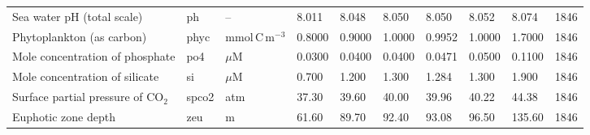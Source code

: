\documentclass[a4paper,fleqn]{cas-sc}
\begin{document}
\begin{table}[width=\linewidth,cols=10,pos=!htbp]
\begin{tabular*}{\tblwidth}{@{} LLLLLLLLL R @{}}
Sea water pH (total scale) & ph & -- & 8.011 & 8.048 & 8.050 & 8.050 & 8.052 & 8.074 & 1846 \\
Phytoplankton (as carbon) & phyc & mmol\,C\,m$^{-3}$ & 0.8000 & 0.9000 & 1.0000 & 0.9952 & 1.0000 & 1.7000 & 1846 \\
Mole concentration of phosphate & po4 & $\mu$M & 0.0300 & 0.0400 & 0.0400 & 0.0471 & 0.0500 & 0.1100 & 1846 \\
Mole concentration of silicate & si & $\mu$M & 0.700 & 1.200 & 1.300 & 1.284 & 1.300 & 1.900 & 1846 \\
Surface partial pressure of CO$_2$ & spco2 & atm & 37.30 & 39.60 & 40.00 & 39.96 & 40.22 & 44.38 & 1846 \\
Euphotic zone depth & zeu & m & 61.60 & 89.70 & 92.40 & 93.08 & 96.50 & 135.60 & 1846 \\
\bottomrule
\end{tabular*}
\label{tab:4}
\end{table}
\end{document}
